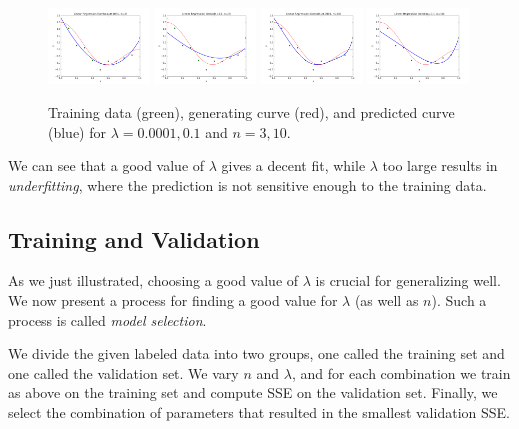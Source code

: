\documentclass[10pt]{paper}
\begin{document}
\begin{figure}[ht!]
  \centering
  \label{fig:ridge}
  \includegraphics[width=0.24\textwidth]{../images/ridge3low.png}
  \includegraphics[width=0.24\textwidth]{../images/ridge3high.png}
  \includegraphics[width=0.24\textwidth]{../images/ridge10low.png}
  \includegraphics[width=0.24\textwidth]{../images/ridge10high.png}
  \caption{Training data (green), generating curve (red), and predicted curve (blue) for $\lambda=0.0001, 0.1$ and $n = 3, 10$.}
\end{figure}

We can see that a good value of $\lambda$ gives a decent fit, while $\lambda$ too large results in \emph{underfitting}, where the prediction is not sensitive enough to the training data.

\subsection{Training and Validation}

As we just illustrated, choosing a good value of $\lambda$ is crucial for generalizing well. We now present a process for finding a good value for $\lambda$ (as well as $n$). Such a process is called \emph{model selection}.

We divide the given labeled data into two groups, one called the training set and one called the validation set. We vary $n$ and $\lambda$, and for each combination we train as above on the training set and compute SSE on the validation set. Finally, we select the combination of parameters that resulted in the smallest validation SSE.
\end{document}
